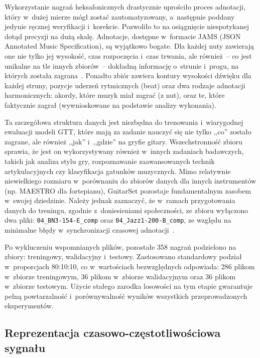 Wykorzystanie nagrań heksafonicznych drastycznie uprościło proces adnotacji, który w~dużej mierze mógł zostać zautomatyzowany, a~następnie poddany jedynie ręcznej weryfikacji i~korekcie. Pozwoliło to na osiągnięcie niespotykanej dotąd precyzji na dużą skalę. Adnotacje, dostępne w~formacie JAMS (JSON Annotated Music Specification), są wyjątkowo bogate. Dla każdej nuty zawierają one nie tylko jej wysokość, czas rozpoczęcia i~czas trwania, ale również~– co jest unikalne na tle innych zbiorów~– dokładną informację o~strunie i~progu, na których została zagrana~\autocite{Wiggins2019TabCNN, Xi2018}. Ponadto zbiór zawiera kontury wysokości dźwięku dla każdej struny, pozycje uderzeń rytmicznych (beat) oraz dwa rodzaje adnotacji harmonicznych: akordy, które muzyk miał zagrać (z nut), oraz te, które faktycznie zagrał (wywnioskowane na podstawie analizy wykonania).

Ta szczegółowa struktura danych jest niezbędna do trenowania i~wiarygodnej ewaluacji modeli GTT, które mają za zadanie nauczyć się nie tylko ,,co'' zostało zagrane, ale również ,,jak'' i~,,gdzie'' na gryfie gitary. Wszechstronność zbioru sprawia, że jest on wykorzystywany również w~innych zadaniach badawczych, takich jak analiza stylu gry, rozpoznawanie zaawansowanych technik artykulacyjnych czy klasyfikacja gatunków muzycznych. Mimo relatywnie niewielkiego rozmiaru w~porównaniu do zbiorów danych dla innych instrumentów (np. MAESTRO dla fortepianu), GuitarSet pozostaje fundamentalnym zasobem w~swojej dziedzinie. Należy jednak zaznaczyć, że w~ramach przygotowania danych do treningu, zgodnie z~doniesieniami społeczności, ze zbioru wyłączono dwa pliki: \texttt{04\_BN3-154-E\_comp} oraz \texttt{04\_Jazz1-200-B\_comp}, ze względu na minimalne błędy w~synchronizacji czasowej adnotacji~\autocite{Riley2023GuitarSetIssue}.

Po wykluczeniu wspomnianych plików, pozostałe 358 nagrań podzielono na zbiory: treningowy, walidacyjny i~testowy. Zastosowano standardowy podział w~proporcjach 80:10:10, co w~wartościach bezwzględnych odpowiada: 286 plikom w~zbiorze treningowym, 36 plikom w~zbiorze walidacyjnym oraz 36 plikom w~zbiorze testowym. Użycie stałego zarodka losowości na tym etapie gwarantuje pełną powtarzalność i~porównywalność wyników wszystkich przeprowadzonych eksperymentów.

\subsection{Reprezentacja czasowo-częstotliwościowa sygnału}
\label{ssec:reprezentacja_sygnalu}

